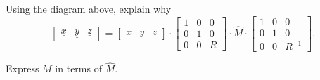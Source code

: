 \documentclass{ximera}
\begin{document}
\begin{problem}
Using the diagram above, explain why%
\[
\begin{bmatrix}
\underline{x} & \underline{y} & \underline{z}%
\end{bmatrix}
=\begin{bmatrix}
x & y & z
\end{bmatrix}
  \cdot\begin{bmatrix}
%
1 & 0 & 0\\
0 & 1 & 0\\
0 & 0 & R
\end{bmatrix}
  \cdot\hat{M}\cdot\begin{bmatrix}
%
1 & 0 & 0\\
0 & 1 & 0\\
0 & 0 & R^{-1}%
\end{bmatrix}.
\]
\begin{hint}
  Express $M$ in terms of $\hat{M}$.
\end{hint}


\end{problem}
\end{document}
